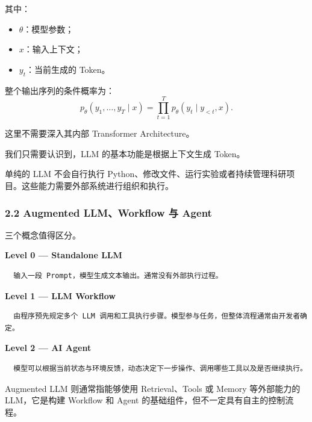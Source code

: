 其中：

\begin{itemize}
\tightlist
\item
  \(\theta\)：模型参数；
\item
  \(x\)：输入上下文；
\item
  \(y_t\)：当前生成的 Token。
\end{itemize}

整个输出序列的条件概率为：
\[p_\theta(y_1,\ldots,y_T\mid x)
=
\prod_{t=1}^{T}
p_\theta(y_t\mid y_{<t},x).\]

这里不需要深入其内部 Transformer Architecture。

我们只需要认识到，LLM 的基本功能是根据上下文生成 Token。

单纯的 LLM 不会自行执行 Python、修改文件、运行实验或者持续管理科研项目。这些能力需要外部系统进行组织和执行。

\hypertarget{part-3-31-0001-augmented-llmworkflow-ux4e0e-agent}{%
\subsubsection{2.2 Augmented LLM、Workflow 与 Agent}\label{part-3-31-0001-augmented-llmworkflow-ux4e0e-agent}}

三个概念值得区分。


\textbf{Level 0 --- Standalone LLM}

\begin{verbatim}
  输入一段 Prompt，模型生成文本输出。通常没有外部执行过程。
\end{verbatim}


\textbf{Level 1 --- LLM Workflow}

\begin{verbatim}
  由程序预先规定多个 LLM 调用和工具执行步骤。模型参与任务，但整体流程通常由开发者确定。
\end{verbatim}


\textbf{Level 2 --- AI Agent}

\begin{verbatim}
  模型可以根据当前状态与环境反馈，动态决定下一步操作、调用哪些工具以及是否继续执行。
\end{verbatim}

Augmented LLM 则通常指能够使用 Retrieval、Tools 或 Memory 等外部能力的 LLM，它是构建 Workflow 和 Agent 的基础组件，但不一定具有自主的控制流程。

